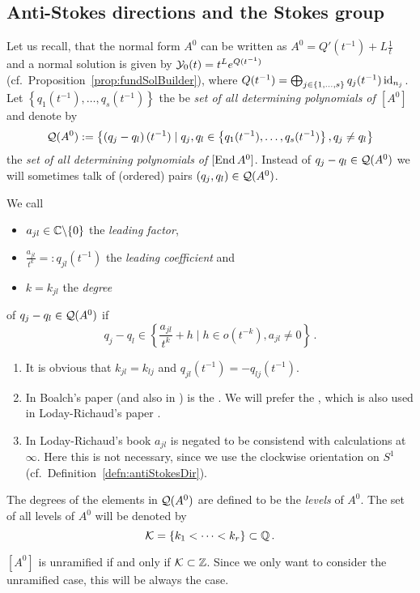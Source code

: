 \subsection{Anti-Stokes directions and the Stokes group}
Let us recall, that the normal form $A^0$ can be written as
$A^0=Q'(t^{-1})+L\frac{1}{t}$ and a normal solution is given by
$\mathcal{Y}_0(t)=t^Le^{Q(t^{-1})}$ (cf.\ Proposition~\ref{prop:fundSolBuilder}), where
$Q(t^{-1})=\bigoplus_{j\in\{1,\dots,s\}}q_j(t^{-1})\operatorname{id}_{n_j}$.
Let $\left\{q_1(t^{-1}),\dots,q_s(t^{-1})\right\}$ the be \emph{set of all
determining polynomials of $[A^0]$} and denote by
\[
  \mathcal{Q}(A^0):=\left\{\left(q_j-q_l\right)(t^{-1})
    \mid
    q_j,q_l\in\left\{q_1(t^{-1}),\dots,q_s(t^{-1})\right\},
    q_j \neq q_l
  \right\}
\]
the \emph{set of all determining polynomials of $[\operatorname{End} A^0]$}.
Instead of $q_j-q_l\in\mathcal{Q}(A^0)$ we will sometimes talk of (ordered) pairs
$(q_j,q_l)\in\mathcal{Q}(A^0)$.
\begin{defn}\label{defn:determiningPolysOfEndA}
  We call
  \begin{itemize}
    \item $a_{jl}\in\mathbb{C}\backslash\{0\}$ the \emph{leading factor},
    \item $\frac{a_{jl}}{t^{k}}=:q_{jl}(t^{-1})$ the \emph{leading
      coefficient} and
    \item $k=k_{jl}$ the \emph{degree}
  \end{itemize}
  of $q_j-q_l\in\mathcal{Q}(A^0)$ if
  \[
    q_j-q_l\in\left\{\frac{a_{jl}}{t^{k}}+h \mid h \in o(t^{-k}), a_{jl}\neq0
    \right\}\,.
  \]
  \begin{s-rem}
    \begin{enumerate}
      \item It is obvious that $k_{jl}=k_{lj}$ and
        $q_{jl}(t^{-1})=-q_{lj}(t^{-1})$.
      \item In Boalch's paper \cite{boalch} (and also in \cite{thboalch}) is
        the .
        We will prefer the , which is also used in
        Loday-Richaud's paper \cite{Loday1994}.
      \item In Loday-Richaud's book \cite[Def.4.3.6]{Loday2014} $a_{jl}$ is
        negated to be consistend with calculations at $\infty$.
        Here this is not necessary, since we use the clockwise orientation on
        $S^1$ (cf.\ Definition~\ref{defn:antiStokesDir}).
    \end{enumerate}
  \end{s-rem}
  The degrees of the elements in $\mathcal{Q}(A^0)$ are defined to be  the
  \emph{levels} of $A^0$.
  The set of all levels of $A^0$ will be denoted by
  \[
    \mathcal{K}=\{k_1<\dots<k_r\} \subset \mathbb{Q} \,.
  \]
  \begin{s-rem}
    $[A^0]$ is unramified if and only if $\mathcal{K}\subset\mathbb{Z}$. Since we only want to
    consider the unramified case, this will be always the case.
  \end{s-rem}
\end{defn}

